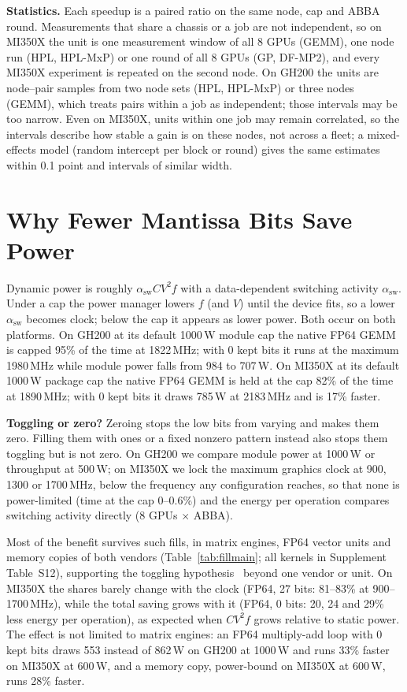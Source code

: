 \documentclass[conference]{IEEEtran}
\newcommand{\W}{\,W}
\newcommand{\pct}{\%}
\begin{document}
\textbf{Statistics.} Each speedup is a paired ratio on the same node, cap and ABBA round. Measurements that share a
chassis or a job are not independent, so on MI350X the unit is one measurement window of all 8 GPUs (GEMM), one node run
(HPL, HPL-MxP) or one round of all 8 GPUs (GP, DF-MP2), and every MI350X experiment is repeated on the second node. On
GH200 the units are node--pair samples from two node sets (HPL, HPL-MxP) or three nodes (GEMM), which treats pairs within
a job as independent; those intervals may be too narrow. Even on MI350X, units within one job may remain correlated,
so the intervals describe how stable a gain is on these nodes, not across a fleet; a mixed-effects model (random
intercept per block or round) gives the same estimates within 0.1 point and intervals of similar width.

\section{Why Fewer Mantissa Bits Save Power}\label{sec:why}

Dynamic power is roughly $\alpha_\mathrm{sw} C V^2 f$ with a data-dependent switching activity $\alpha_\mathrm{sw}$.
Under a cap the power manager lowers $f$ (and $V$) until the device fits, so a lower $\alpha_\mathrm{sw}$ becomes clock;
below the cap it appears as lower power. Both occur on both platforms. On GH200 at its default 1000\W{} module cap the
native FP64 GEMM is capped 95\pct{} of the time at 1822\,MHz; with 0 kept bits it runs at the maximum 1980\,MHz while
module power falls from 984 to 707\W. On MI350X at its default 1000\W{} package cap the native FP64 GEMM is held at the
cap 82\pct{} of the time at 1890\,MHz; with 0 kept bits it draws 785\W{} at 2183\,MHz and is 17\pct{} faster.

\textbf{Toggling or zero?} Zeroing stops the low bits from varying and makes them zero. Filling them with ones or a
fixed nonzero pattern instead also stops them toggling but is not zero. On GH200 we compare module power at 1000\W{} or
throughput at 500\W; on MI350X we lock the maximum graphics clock at 900, 1300 or 1700\,MHz, below the frequency any
configuration reaches, so that none is power-limited (time at the cap 0--0.6\pct) and the energy per operation compares
switching activity directly (8 GPUs $\times$ ABBA).

Most of the benefit survives such fills, in matrix engines, FP64 vector units and memory copies of both vendors
(Table~\ref{tab:fillmain}; all kernels in Supplement Table~S12), supporting the toggling hypothesis~\cite{Gregersen2024} beyond one vendor or unit. On MI350X the
shares barely change with the clock (FP64, 27 bits: 81--83\pct{} at 900--1700\,MHz), while the total saving grows with it
(FP64, 0 bits: 20, 24 and 29\pct{} less energy per operation), as expected when $CV^2f$ grows relative to static power.
The effect is not limited to matrix engines: an FP64 multiply-add loop with 0 kept bits draws 553 instead
of 862\W{} on GH200 at 1000\W{} and runs 33\pct{} faster on MI350X at 600\W, and a memory copy, power-bound on MI350X at
600\W, runs 28\pct{} faster.
\end{document}
